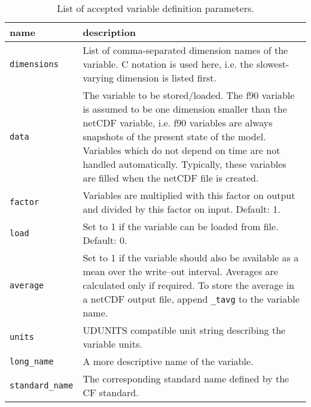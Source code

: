 \begin{table}[htbp]
 \begin{center}
  \begin{tabular*}{\textwidth}{@{\extracolsep{\fill}}|l|p{10cm}|}
    \hline
    name & description \\
    \hline
    \hline
    \texttt{dimensions} & List of comma-separated dimension names of the variable. C notation is used here, i.e. the slowest-varying dimension is listed first.\\
    \hline
    \texttt{data} & The variable to be stored/loaded. The f90 variable is assumed to be one dimension smaller than the netCDF variable, i.e. f90 variables are always snapshots of the present state of the model. Variables which do not depend on time are not handled automatically. Typically, these variables are filled when the netCDF file is created.\\
    \hline
    \texttt{factor} & Variables are multiplied with this factor on output and divided by this factor on input. Default: 1.\\
    \hline
    \texttt{load} & Set to 1 if the variable can be loaded from file. Default: 0.\\
    \hline
    \texttt{average} & Set to 1 if the variable should also be available as a mean over the write--out interval. Averages are calculated only if required. To store the average in a netCDF output file, append \texttt{\_tavg} to the variable name.\\
    \hline
    \texttt{units} & UDUNITS compatible unit string describing the variable units.\\
    \hline
    \texttt{long\_name} & A more descriptive name of the variable.\\
    \hline
    \texttt{standard\_name} & The corresponding standard name defined by the CF standard.\\
    \hline
  \end{tabular*}
  \caption{List of accepted variable definition parameters.}
  \label{dg.tab.vdf}
 \end{center}
\end{table}
